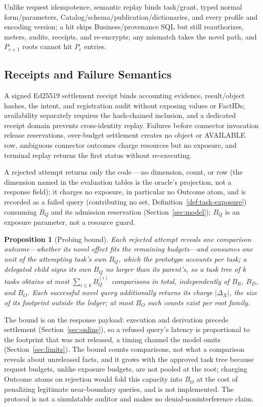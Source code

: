\documentclass[10pt,journal,compsoc]{IEEEtran}
\newcommand{\code}[1]{\texttt{\detokenize{#1}}}
\newtheorem{proposition}{Proposition}
\begin{document}
Unlike request idempotence, semantic replay binds task/grant, typed normal
form/parameters, Catalog/schema/publication/dictionaries, and every profile
and encoding version; a hit skips Business/provenance SQL but still
reauthorizes, meters, audits, receipts, and re-encrypts; any mismatch takes
the novel path, and $P_{e+1}$ roots cannot hit $P_e$ entries.

\subsection{Receipts and Failure Semantics}

A signed Ed25519 settlement receipt binds accounting evidence, result/object
hashes, the \code{PENDING} intent, and registration audit without exposing
values or FactIDs; availability separately requires the hash-chained
\code{QUERY_RESULT_CONSUMED} inclusion, and a dedicated receipt domain
prevents cross-identity replay. Failures before connector invocation release
reservations, over-budget settlement creates no object or AVAILABLE row,
ambiguous connector outcomes charge resources but no exposure, and terminal
replay returns the first status without re-executing.

A rejected attempt returns only the code
\code{EXPOSURE_BUDGET_EXHAUSTED}---no dimension, count, or row (the
dimension named in the evaluation tables is the oracle's projection, not a
response field); it charges no exposure, in particular no Outcome atom, and
is recorded as a failed query (contributing no set,
Definition~\ref{def:task-exposure}) consuming $B_Q$ and its admission
reservation (Section~\ref{sec:model}); $B_Q$ is an exposure parameter,
not a resource guard.

\begin{proposition}[Probing bound]
\label{prop:probing-bound}
Each rejected attempt reveals one comparison outcome---whether its novel
effect fits the remaining budgets---and consumes one unit of the attempting
task's own $B_Q$, which the prototype accounts per task; a delegated child
signs its own $B_Q$ no larger than its parent's, so a task tree of $k$ tasks
obtains at most $\sum_{i\le k}B_Q^{(i)}$ comparisons in total, independently
of $B_R$, $B_D$, and $B_O$. Each successful novel query additionally
returns its charge $|\Delta_X|$, the size of its footprint outside the
ledger; at most $B_O$ such counts exist per root family.
\end{proposition}
The bound is on the response payload: execution and derivation precede
settlement (Section~\ref{sec:online}), so a refused query's latency is
proportional to the footprint that was not released, a timing channel the
model omits (Section~\ref{sec:limits}). The bound counts comparisons, not
what a comparison reveals about unreleased facts, and it grows with the
approved task tree because request
budgets, unlike exposure budgets, are not pooled at the root; charging
Outcome atoms on rejection would fold this capacity into $B_O$ at the cost of
penalizing legitimate near-boundary queries, and is not implemented. The
protocol is not a simulatable auditor and makes no denial-noninterference
claim.
\end{document}
